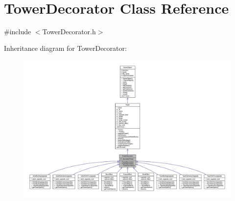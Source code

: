 \hypertarget{class_tower_decorator}{\section{Tower\+Decorator Class Reference}
\label{class_tower_decorator}
}


{\ttfamily \#include $<$Tower\+Decorator.\+h$>$}



Inheritance diagram for Tower\+Decorator\+:
\nopagebreak
\begin{figure}[H]
\begin{center}
\leavevmode
\includegraphics[width=350pt]{class_tower_decorator__inherit__graph}
\end{center}
\end{figure}


